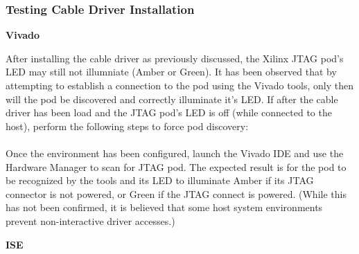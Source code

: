 \subsubsection{Testing Cable Driver Installation}
\textbf{Vivado}
\begin{flushleft}
After installing the cable driver as previously discussed, the Xilinx JTAG pod's LED may still not illumniate (Amber or Green).  It has been observed that by attempting to establish a connection to the pod using the Vivado tools, only then will the pod be discovered and correctly illuminate it's LED. If after the cable driver has been load and the JTAG pod's LED is off (while connected to the host), perform the following steps to force pod discovery: \medskip\newline
{} \\
 \\\medskip
Once the environment has been configured, launch the Vivado IDE and use the Hardware Manager to scan for JTAG pod. The expected result is for the pod to be recognized by the tools and its LED to illuminate Amber if its JTAG connector is not powered, or Green if the JTAG connect is powered.\newline
(While this has not been confirmed, it is believed that some host system environments prevent non-interactive driver accesses.)\medskip
\end{flushleft}
\textbf{ISE}
